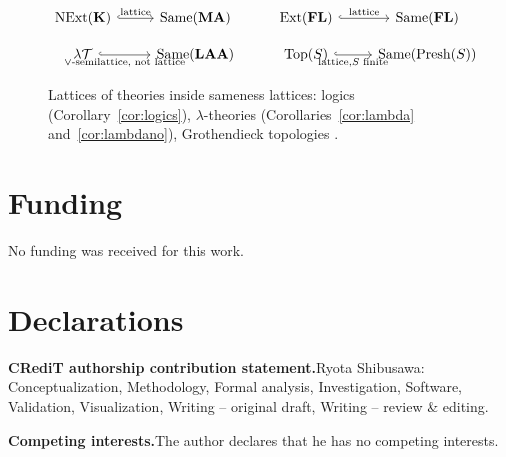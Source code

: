 \documentclass[11pt]{amsart}
\theoremstyle{definition}
\newcommand{\Same}{\mathrm{Same}}
\newcommand{\Presh}{\mathrm{Presh}}
\newcommand{\NExt}{\mathrm{NExt}}
\newcommand{\Ext}{\mathrm{Ext}}
\newcommand{\lT}{\lambda\mathcal T}
\begin{document}
\begin{figure}[ht]
\[
\begin{tikzcd}[row sep=small]
\NExt(\mathbf K)\arrow[r,hook,"\text{lattice}"] & \Same(\mathbf{MA}) &
\Ext(\mathbf{FL})\arrow[r,hook,"\text{lattice}"] & \Same(\mathbf{FL})\\
\lT\arrow[r,hook,"\vee\text{-semilattice, not lattice}"'] & \Same(\mathbf{LAA}) &
\mathrm{Top}(S)\arrow[r,hook,"{\text{lattice}, S\text{ finite}}"'] & \Same(\Presh(S))
\end{tikzcd}
\]
\caption{Lattices of theories inside sameness lattices: logics (Corollary~\ref{cor:logics}),
$\lambda$-theories (Corollaries~\ref{cor:lambda} and~\ref{cor:lambdano}), Grothendieck topologies \cite{Finitejoin}.}
\end{figure}

\section*{Funding}
No funding was received for this work.

\section*{Declarations}
\noindent\textbf{CRediT authorship contribution statement.}\quad Ryota Shibusawa:
Conceptualization, Methodology, Formal analysis, Investigation, Software,
Validation, Visualization, Writing -- original draft, Writing -- review \& editing.

\noindent\textbf{Competing interests.}\quad The author declares that he has no
competing interests.
\end{document}
